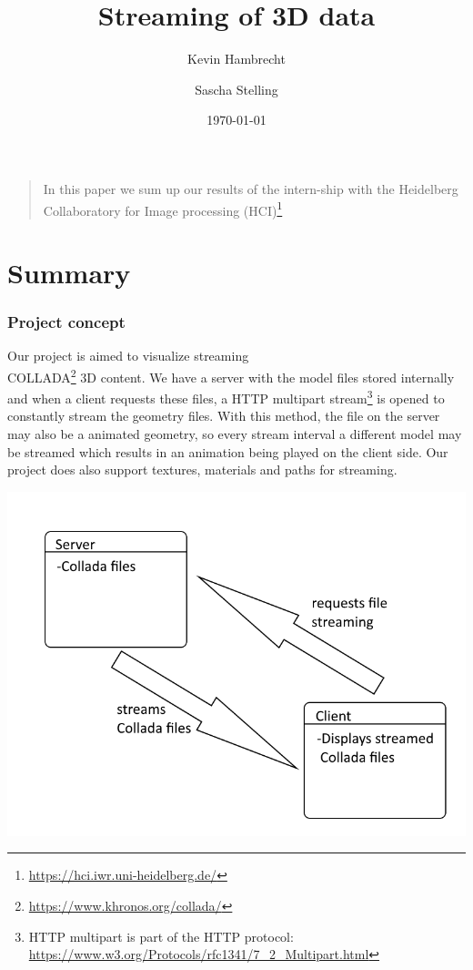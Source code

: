 \documentclass[%
aip,
jmp,
amsmath,amssymb,
reprint,
nofootinbib
]{revtex4-1}
\begin{document}
	
	\title[Report: Streaming of 3D data]{Streaming of 3D data}
	
	\author{Kevin Hambrecht}
	\author{Sascha Stelling}
	\date{\today}
	
	
	\maketitle
	
	\begin{quotation}
		In this paper we sum up our results of the intern-ship with the Heidelberg Collaboratory for Image processing (HCI)\footnote{\url{https://hci.iwr.uni-heidelberg.de/}}
	\end{quotation}
	
	\section{\label{sec:level1}Summary}
	
	
	
	\subsubsection{\label{sec:level2}Project concept}
	
	Our project is aimed to visualize streaming \\COLLADA\footnote{\url{https://www.khronos.org/collada/}} 3D content. We have a server with the model files stored internally and when a client requests these files, a HTTP multipart stream\footnote{HTTP multipart is part of the HTTP protocol: \\\url{https://www.w3.org/Protocols/rfc1341/7_2_Multipart.html}} is opened to constantly stream the geometry files. With this method, the file on the server may also be a animated geometry, so every stream interval a different model may be streamed which results in an animation being played on the client side. Our project does also support textures, materials and paths for streaming.
	
	\includegraphics[width=\linewidth]{images/concept}
	
\end{document}
